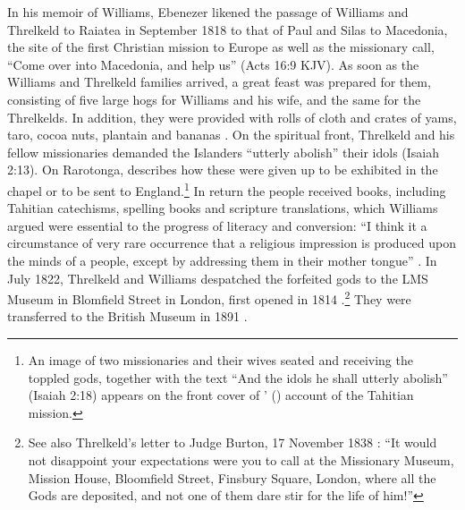 In his memoir of Williams, Ebenezer \citet[42]{prout_memoirs_1843} likened the passage of Williams and Threlkeld to Raiatea in September 1818 to that of Paul and Silas to Macedonia, the site of the first Christian mission to Europe as well as the missionary call, “Come over into Macedonia, and help us” (Acts 16:9 KJV). As soon as the Williams and Threlkeld families arrived, a great feast was prepared for them, consisting of five large hogs for Williams and his wife, and the same for the Threlkelds. In addition, they were provided with rolls of cloth and crates of yams, taro, cocoa nuts, plantain and bananas \citep[43]{prout_memoirs_1843}. On the spiritual front, Threlkeld and his fellow missionaries demanded the Islanders “utterly abolish” their idols (Isaiah 2:13). On Rarotonga, \citet[98--99]{williams_narrative_1839} describes how these were given up to be exhibited in the chapel or to be sent to England.\footnote{An image of two missionaries and their wives seated and receiving the toppled gods, together with the text “And the idols he shall utterly abolish” (Isaiah 2:18) appears on the front cover of \citeauthor{williams_narrative_1839}’ (\citeyear{williams_narrative_1839}) account of the Tahitian mission.} In return the people received books, including Tahitian catechisms, spelling books and scripture translations, which Williams argued were essential to the progress of literacy and conversion: “I think it a circumstance of very rare occurrence that a religious impression is produced upon the minds of a people, except by addressing them in their mother tongue” \citep[104]{williams_narrative_1839}. In July 1822, Threlkeld and Williams despatched the forfeited gods to the LMS Museum in Blomfield Street in London, first opened in 1814 \citep{hooper_embodying_2007}.\footnote{See also Threlkeld’s letter to Judge Burton, 17 November 1838 \citep[274]{gunson_australian_1974b}: “It would not disappoint your expectations were you to call at the Missionary Museum, Mission House, Bloomfield Street, Finsbury Square, London, where all the Gods are deposited, and not one of them dare stir for the life of him!”} They were transferred to the British Museum in 1891 \citep[308, n. 47]{gunson_australian_1974b}.


